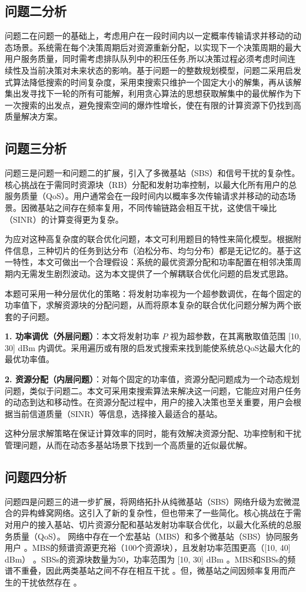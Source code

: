 \documentclass{ctexart}
\begin{document}
\subsection{问题二分析}
问题二在问题一的基础上，考虑用户在一段时间内以一定概率传输请求并移动的动态场景。系统需在每个决策周期后对资源重新分配，以实现下一个决策周期的最大用户服务质量，同时需考虑排队队列中的积压任务,所以决策过程必须考虑时间连续性及当前决策对未来状态的影响。基于问题一的整数规划模型，问题二采用启发式算法降低搜索的时间复杂度，采用束搜索只维护一个固定大小的解集，再从该解集出发寻找下一轮的所有可能解，利用贪心算法的思想获取解集中的最优解作为下一次搜索的出发点，避免搜索空间的爆炸性增长，使在有限的计算资源下仍找到高质量解决方案。

\subsection{问题三分析}
问题三是问题一和问题二的扩展，引入了多微基站（SBS）和信号干扰的复杂性。核心挑战在于需同时资源块（RB）分配和发射功率控制，以最大化所有用户的总服务质量（QoS）。用户通常会在一段时间内以概率多次传输请求并移动的动态场景。因微基站之间存在频率复用，不同传输链路会相互干扰，这使信干噪比（SINR）的计算变得更为复杂。

为应对这种高复杂度的联合优化问题，本文可利用题目的特性来简化模型。根据附件信息，三种切片的任务到达分布（泊松分布、均匀分布）都是无记忆的。基于这一特性，本文可做出一个合理假设：系统的最优资源分配和功率配置在相邻决策周期内无需发生剧烈波动。这为本文提供了一个解耦联合优化问题的启发式思路。

本题可采用一种分层优化的策略：将发射功率视为一个超参数调优，在每个固定的功率值下，求解资源块的分配问题，从而将原本复杂的联合优化问题分解为两个嵌套的子问题。

\textbf{1. 功率调优（外层问题）}：本文将发射功率 $P$ 视为超参数，在其离散取值范围 [10, 30] dBm 内调优。采用遍历或有限的启发式搜索来找到能使系统总QoS达最大化的最优功率值。

\textbf{2. 资源分配（内层问题）}：对每个固定的功率值，资源分配问题成为一个动态规划问题，类似于问题二。本文可采用束搜索算法来解决这一问题，它能应对用户任务的动态到达和移动性。在资源分配过程中，用户的接入决策也至关重要，用户会根据当前信道质量（SINR）等信息，选择接入最适合的基站。

这种分层求解策略在保证计算效率的同时，能有效解决资源分配、功率控制和干扰管理问题，从而在动态多基站场景下找到一个高质量的近似最优解。

\subsection{问题四分析}
问题四是问题三的进一步扩展，将网络拓扑从纯微基站（SBS）网络升级为宏微混合的异构蜂窝网络。这引入了新的复杂性，但也带来了一些简化。核心挑战在于需对用户的接入基站、切片资源分配和基站发射功率联合优化，以最大化系统的总服务质量（QoS）。
网络中存在一个宏基站（MBS）和多个微基站（SBS）协同服务用户 。MBS的频谱资源更充裕（100个资源块），且发射功率范围更高（[10, 40] dBm） 。SBSs的资源块数量为50，功率范围为 [10, 30] dBm 。MBS和SBSs的频谱不重叠，因此两类基站之间不存在相互干扰 。但，微基站之间因频率复用而产生的干扰依然存在 。
\end{document}
